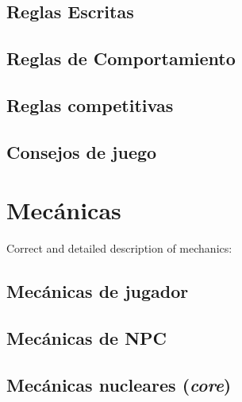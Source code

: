     \subsection{Reglas Escritas}

    \subsection{Reglas de Comportamiento}

    \subsection{Reglas competitivas}

    \subsection{Consejos de juego}


\section{Mecánicas}
Correct and detailed description of mechanics:
    \subsection{Mecánicas de jugador}
    \subsection{Mecánicas de NPC}
    \subsection{Mecánicas nucleares (\textit{core})}
